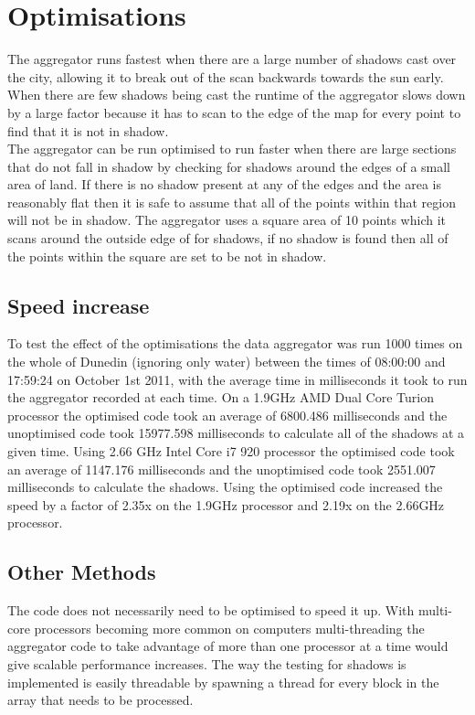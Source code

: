 \documentclass[12pt]{report}
\begin{document}
\section{Optimisations}
The aggregator runs fastest when there are a large number of shadows cast over the city, allowing it to break out of the scan backwards towards the sun early. When there are few shadows being cast the runtime of the aggregator slows down by a large factor because it has to scan to the edge of the map for every point to find that it is not in shadow.\\

The aggregator can be run optimised to run faster when there are large sections that do not fall in shadow by checking for shadows around the edges of a small area of land. If there is no shadow present at any of the edges and the area is reasonably flat then it is safe to assume that all of the points within that region will not be in shadow. The aggregator uses a square area of 10 points which it scans around the outside edge of for shadows, if no shadow is found then all of the points within the square are set to be not in shadow.\\

\subsection{Speed increase}
To test the effect of the optimisations the data aggregator was run 1000 times on the whole of Dunedin (ignoring only water) between the times of 08:00:00 and 17:59:24 on October 1st 2011, with the average time in milliseconds it took to run the aggregator recorded at each time. On a 1.9GHz AMD Dual Core Turion processor the optimised code took an average of 6800.486 milliseconds and the unoptimised code took 15977.598 milliseconds to calculate all of the shadows at a given time. Using 2.66 GHz Intel Core i7 920 processor the optimised code took an average of 1147.176 milliseconds and the unoptimised code took 2551.007 milliseconds to calculate the shadows. Using the optimised code increased the speed by a factor of 2.35x on the 1.9GHz processor and 2.19x on the 2.66GHz processor.\\

\subsection{Other Methods}
The code does not necessarily need to be optimised to speed it up. With multi-core processors becoming more common on computers multi-threading the aggregator code to take advantage of more than one processor at a time would give scalable performance increases. The way the testing for shadows is implemented is easily threadable by spawning a thread for every block in the array that needs to be processed.\\
\end{document}
